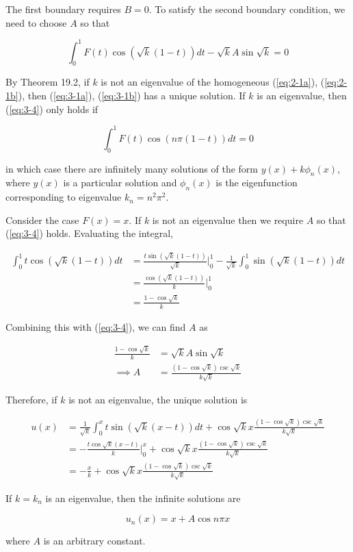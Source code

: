 \documentclass{article}
\begin{document}
The first boundary requires $B = 0$. To satisfy the second boundary
condition, we need to choose $A$ so that

\begin{equation} \label{eq:3-4}
    \int_0^1 F(t)\cos(\sqrt k(1 - t)) dt -\sqrt k A\sin\sqrt k = 0
\end{equation}

By Theorem 19.2, if $k$ is not an eigenvalue of the homogeneous
(\ref{eq:2-1a}), (\ref{eq:2-1b}), then (\ref{eq:3-1a}), (\ref{eq:3-1b})
has a unique solution. If $k$ is an eigenvalue, then (\ref{eq:3-4})
only holds if

\begin{equation} \label{eq:3-5}
    \int_0^1 F(t)\cos(n\pi(1 - t)) dt = 0
\end{equation}

in which case there are infinitely many solutions of the form
$y(x) + k\phi_n(x)$, where $y(x)$ is a particular solution and
$\phi_n(x)$ is the eigenfunction corresponding to eigenvalue
$k_n = n^2\pi^2$.

\hfill \break
Consider the case $F(x) = x$. If $k$ is not an eigenvalue then we
require $A$ so that (\ref{eq:3-4}) holds. Evaluating the integral,

\begin{align*}
    \int_0^1 t\cos(\sqrt k(1 - t))dt &=
        \frac{t\sin(\sqrt k(1 - t))}{\sqrt k}\bigg\vert_0^1
        - \frac{1}{\sqrt k}\int_0^1 \sin(\sqrt k(1 - t)) dt\\
    &= \frac{\cos(\sqrt k(1 - t))}{k}\bigg\vert_0^1\\
    &= \frac{1 - \cos\sqrt k}{k}
\end{align*}

Combining this with (\ref{eq:3-4}), we can find $A$ as

\begin{align*}
    \frac{1 - \cos\sqrt k}{k} &= \sqrt k A\sin\sqrt k\\
    \implies A &= \frac{(1 - \cos\sqrt k)\csc\sqrt k}{k\sqrt k}
\end{align*}

Therefore, if $k$ is not an eigenvalue, the unique solution is

\begin{align*}
    u(x) &= \frac{1}{\sqrt k}\int_0^x t\sin(\sqrt k(x - t)) dt
        + \cos\sqrt k x \frac{(1 - \cos\sqrt k)\csc\sqrt k}{k\sqrt k}\\
    &= -\frac{t\cos\sqrt k(x - t)}{k}\bigg\vert_0^x
        + \cos\sqrt k x \frac{(1 - \cos\sqrt k)\csc\sqrt k}{k \sqrt k}\\
    &= -\frac{x}{k} + \cos\sqrt k x \frac{(1 - \cos\sqrt k)\csc\sqrt k}{k \sqrt k}
\end{align*}

If $k = k_n$ is an eigenvalue, then the infinite solutions are

\begin{equation*}
    u_n(x) = x + A\cos n\pi x
\end{equation*}

where $A$ is an arbitrary constant.
\end{document}
